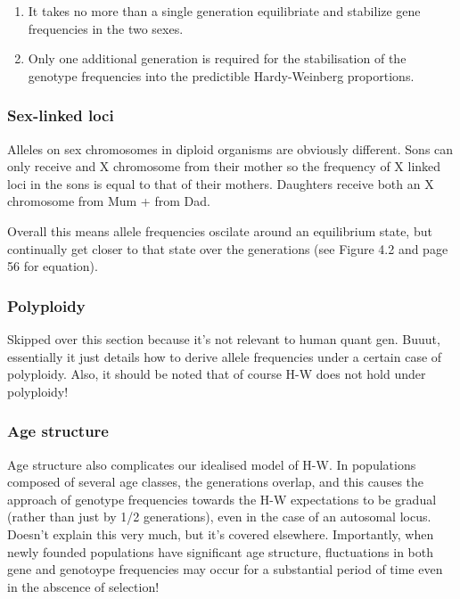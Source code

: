 \documentclass[
]{article}
\providecommand{\tightlist}{%
  \setlength{\itemsep}{0pt}\setlength{\parskip}{0pt}}
\begin{document}
\begin{enumerate}
\def\labelenumi{\arabic{enumi}.}
\tightlist
\item
  It takes no more than a single generation equilibriate and stabilize
  gene frequencies in the two sexes.
\item
  Only one additional generation is required for the stabilisation of
  the genotype frequencies into the predictible Hardy-Weinberg
  proportions.
\end{enumerate}

\hypertarget{sex-linked-loci}{%
\subsubsection{Sex-linked loci}\label{sex-linked-loci}}

Alleles on sex chromosomes in diploid organisms are obviously different.
Sons can only receive and X chromosome from their mother so the
frequency of X linked loci in the sons is equal to that of their
mothers. Daughters receive both an X chromosome from Mum + from Dad.

Overall this means allele frequencies oscilate around an equilibrium
state, but continually get closer to that state over the generations
(see Figure 4.2 and page 56 for equation).

\hypertarget{polyploidy}{%
\subsubsection{Polyploidy}\label{polyploidy}}

Skipped over this section because it's not relevant to human quant gen.
Buuut, essentially it just details how to derive allele frequencies
under a certain case of polyploidy. Also, it should be noted that of
course H-W does not hold under polyploidy!

\hypertarget{age-structure}{%
\subsubsection{Age structure}\label{age-structure}}

Age structure also complicates our idealised model of H-W. In
populations composed of several age classes, the generations overlap,
and this causes the approach of genotype frequencies towards the H-W
expectations to be gradual (rather than just by 1/2 generations), even
in the case of an autosomal locus. Doesn't explain this very much, but
it's covered elsewhere. Importantly, when newly founded populations have
significant age structure, fluctuations in both gene and genotoype
frequencies may occur for a substantial period of time even in the
abscence of selection!
\end{document}
